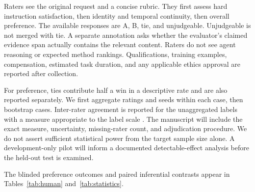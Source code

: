 Raters see the original request and a concise rubric. They first assess hard
instruction satisfaction, then identity and temporal continuity, then overall
preference. The available responses are A, B, tie, and unjudgeable. Unjudgeable
is not merged with tie. A separate annotation asks whether the evaluator's
claimed evidence span actually contains the relevant content. Raters do not see
agent reasoning or expected method rankings. Qualifications, training examples,
compensation, estimated task duration, and any applicable ethics approval are
reported after collection.

For preference, ties contribute half a win in a descriptive rate and are also
reported separately. We first aggregate ratings and seeds within each case,
then bootstrap cases. Inter-rater agreement is reported for the unaggregated
labels with a measure appropriate to the label scale \citep{artsteinpoesio2008intercoder}. The manuscript will
include the exact measure, uncertainty, missing-rater count, and adjudication
procedure. We do not assert sufficient statistical power from the target sample
size alone. A development-only pilot will inform a documented detectable-effect
analysis before the held-out test is examined.

The blinded preference outcomes and paired inferential contrasts appear in
Tables~\ref{tab:human} and~\ref{tab:statistics}.

